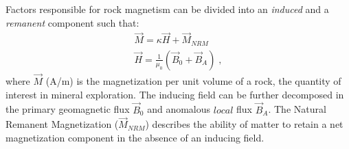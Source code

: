 Factors responsible for rock magnetism can be divided into an \emph{induced} and a \emph{remanent} component such that:
\begin{gather}
	\vec M = \kappa \vec H + \vec M_{NRM} \\
	 \vec H =\frac{1}{\mu_0}(\vec B_0 + \vec B_A) \;,
	 \end{gather}
where $\vec M$ (A/m) is the magnetization per unit volume of a rock, the quantity of interest in mineral exploration.
The inducing field can be further decomposed in the primary geomagnetic flux $\vec B_0$ and anomalous $local$ flux $\vec B_{A}$. The Natural Remanent Magnetization ($\vec M_{NRM}$) describes the ability of matter to retain a net magnetization component in the absence of an inducing field.

